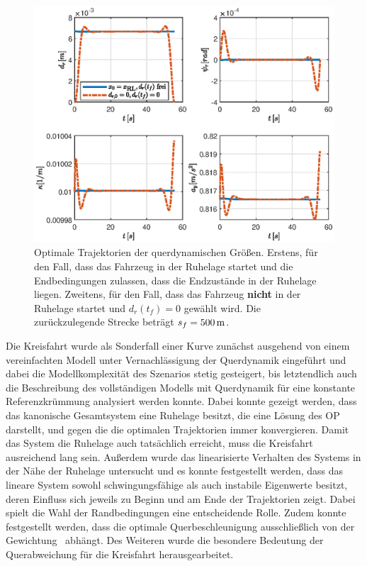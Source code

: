 \begin{figure}[h] 
	\centering
	\includegraphics[width=\linewidth]{./Bilder/Ergebnisse/Kreisfahrt/Mit_Querdynamik/Querdyn_RL_ay.eps}
	\caption{Optimale Trajektorien der querdynamischen Größen. Erstens, für den Fall, dass das Fahrzeug in der Ruhelage startet und die Endbedingungen zulassen, dass die Endzustände in der Ruhelage liegen. Zweitens, für den Fall, dass das Fahrzeug \textbf{nicht} in der Ruhelage startet und $d_r(t_f) = 0$ gewählt wird. Die zurückzulegende Strecke beträgt $s_f = 500\,\mathrm{m}$.}
	\label{fig:Querdyn_RL_ay}
\end{figure} 

Die Kreisfahrt wurde als Sonderfall einer Kurve zunächst ausgehend von einem vereinfachten Modell unter Vernachlässigung der Querdynamik eingeführt und dabei die Modellkomplexität des Szenarios stetig gesteigert, bis letztendlich auch die Beschreibung des vollständigen Modells mit Querdynamik für eine konstante Referenzkrümmung analysiert werden konnte. Dabei konnte gezeigt werden, dass das kanonische Gesamtsystem eine Ruhelage besitzt, die eine Lösung des \gls{OP} darstellt, und gegen die die optimalen Trajektorien immer konvergieren. Damit das System die Ruhelage auch tatsächlich erreicht, muss die Kreisfahrt ausreichend lang sein. Außerdem wurde das linearisierte Verhalten des Systems in der Nähe der Ruhelage untersucht und es konnte festgestellt werden, dass das lineare System sowohl schwingungsfähige als auch instabile Eigenwerte besitzt, deren Einfluss sich jeweils zu Beginn und am Ende der Trajektorien zeigt. Dabei spielt die Wahl der Randbedingungen eine entscheidende Rolle. Zudem konnte festgestellt werden, dass die optimale Querbeschleunigung ausschließlich von der Gewichtung \fay~abhängt. Des Weiteren wurde die besondere Bedeutung der Querabweichung für die Kreisfahrt herausgearbeitet. 

